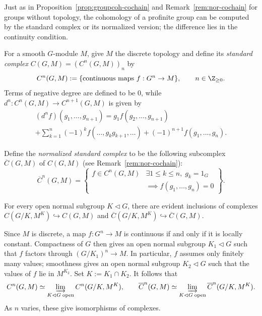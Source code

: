 Just as in Proposition~\ref{prop:groupcoh-cochain} and
Remark~\ref{rem:nor-cochain} for groups without topology, the cohomology of a
profinite group can be computed by the standard complex or its normalized
version; the difference lies in the continuity condition.

\begin{definition}
	For a smooth $G$-module $M$, give $M$ the discrete topology and define its
	\emph{standard complex} $C(G,M)=(C^n(G,M))_n$ by
	\[ C^n(G,M):=\{\text{continuous maps }f:G^n\to M\},
	\qquad n\in\Z_{\geq0}. \]
	Terms of negative degree are defined to be $0$, while
	$d^n:C^n(G,M)\to C^{n+1}(G,M)$ is given by
	\begin{multline*}
		(d^nf)(g_1,\ldots,g_{n+1})
		=g_1f(g_2,\ldots,g_{n+1})\\
		+\sum_{k=1}^n(-1)^kf(\ldots,g_kg_{k+1},\ldots)
		+(-1)^{n+1}f(g_1,\ldots,g_n).
	\end{multline*}

	Define the \emph{normalized standard complex} to be the following
	subcomplex $\overline{C}(G,M)$ of $C(G,M)$
	(see Remark~\ref{rem:nor-cochain}):
	\[ \overline{C}^n(G,M)=\left\{\begin{array}{r|l}
		f\in C^n(G,M)&\exists 1\leq k\leq n,\; g_k=1_G\\
		&\implies f(g_1,\ldots,g_n)=0
	\end{array}\right\}. \]
\end{definition}

For every open normal subgroup $K\lhd G$, there are evident inclusions of
complexes
$C(G/K,M^K)\hookrightarrow C(G,M)$ and
$\overline{C}(G/K,M^K)\hookrightarrow\overline{C}(G,M)$.

Since $M$ is discrete, a map $f:G^n\to M$ is continuous if and only if it is
locally constant. Compactness of $G$ then gives an open normal subgroup
$K_1\lhd G$ such that $f$ factors through $(G/K_1)^n\to M$. In particular,
$f$ assumes only finitely many values; smoothness gives an open normal
subgroup $K_2\lhd G$ such that the values of $f$ lie in $M^{K_2}$. Set
$K:=K_1\cap K_2$. It follows that
\[ C^n(G,M)\simeq\varinjlim_{K\lhd G\;\text{open}}C^n(G/K,M^K),\qquad
	\overline{C}^n(G,M)\simeq
	\varinjlim_{K\lhd G\;\text{open}}\overline{C}^n(G/K,M^K). \]
As $n$ varies, these give isomorphisms of complexes.

